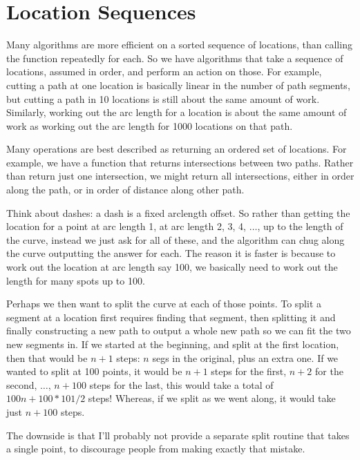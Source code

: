 \documentclass[openany]{book}
\begin{document}
\section{Location Sequences}

Many algorithms are more efficient on a sorted sequence of locations,
than calling the function repeatedly for each.  So we have algorithms
that take a sequence of locations, assumed in order, and perform an
action on those.  For example, cutting a path at one location is
basically linear in the number of path segments, but cutting a path in
10 locations is still about the same amount of work.  Similarly,
working out the arc length for a location is about the same amount of
work as working out the arc length for 1000 locations on that path.

Many operations are best described as returning an ordered set of
locations.  For example, we have a function that returns
intersections between two paths.  Rather than return just one
intersection, we might return all intersections, either in order along
the path, or in order of distance along other path.

Think about dashes: a dash is a fixed arclength offset.  So rather
than getting the location for a point at arc length 1, at arc length
2, 3, 4, $\ldots$, up to the length of the curve, instead we just ask for all of
these, and the algorithm can chug along the curve outputting the
answer for each.  The reason it is faster is because to work out the
location at arc length say 100, we basically need to work out the
length for many spots up to 100.

Perhaps we then want to split the curve at each of those points.  To
split a segment at a location first requires finding that segment,
then splitting it and finally constructing a new path to output a whole
new path so we can fit the two new segments in.  If we started at the
beginning, and split at the first location, then that would be $n+1$ steps: $n$
segs in the original, plus an extra one.  If we wanted to split at 100
points, it would be $n+1$ steps for the first, $n+2$ for the
second, $\ldots$, $n+100$ steps for the last, this would take a total of $100n +
100*101/2$ steps!  Whereas, if we split as we went along, it would take
just $n+100$ steps.

The downside is that I'll probably not provide a separate split
routine that takes a single point, to discourage people from making
exactly that mistake.
\end{document}

